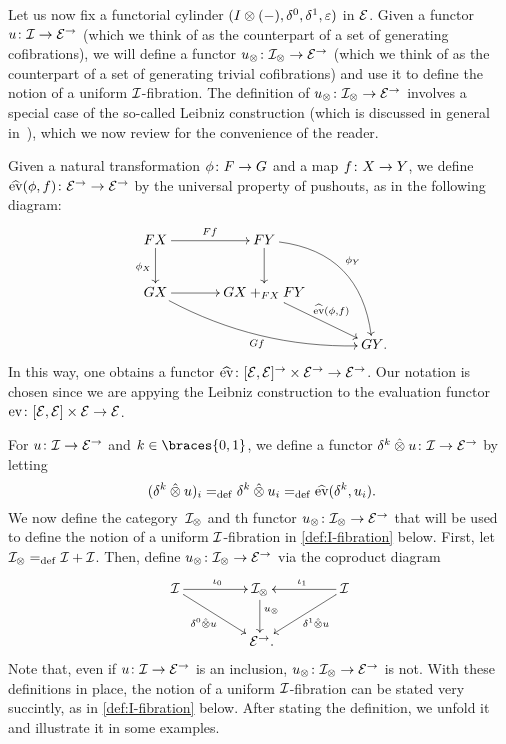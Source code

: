 \documentclass[reqno,10pt,a4paper,oneside,draft]{amsart}
\begin{document}
Let us now fix a functorial cylinder $(\interval \otimes (-), \lcyl, \rcyl, \ccyl)$ in $\calE$.
Given a functor $u \co \cal{I} \to \catE^\to$ (which we think of as the counterpart of a set of generating cofibrations), we will define a functor $u_\otimes \co \cal{I}_\otimes \to \catE^\to$ (which we think of as the counterpart of a set of generating trivial cofibrations) and use it to define the notion of a uniform $\cal{I}$-fibration.
The definition of $u_\otimes \co \cal{I}_\otimes \to \catE^\to$ involves a special case of the so-called Leibniz construction (which is discussed in general in~\cite{riehl-verity:reedy}), which we now review for the convenience of the reader.

Given a natural transformation $\phi \co F \to G$ and a map $f \co X \to Y$, we define $\hateval(\phi, f) \co \catE^\to \to \catE^\to$ by the universal property of pushouts, as in the following diagram:
\begin{gather*}
\xymatrix@C=1.2cm{
  FX \ar[r]^{Ff} \ar[d]_{\phi_X} & FY \ar@/^2pc/[ddr]^{\phi_Y} \ar[d] & \\
  GX \ar@/_1pc/[drr]_{Gf} \ar[r] & GX +_{FX} FY  \ar[dr]^-{\hateval(\phi, f)} & \\
  & & GY
\rlap{.}}
\end{gather*}
In this way, one obtains a functor $\hateval \co [\catE, \catE]^\to \times \catE^\to \to \catE^\to$.
Our notation is chosen since we are appying the Leibniz construction to the evaluation functor $\eval \co [\catE,\catE] \times \calE \to \catE$.

For $u \co \cal{I} \to \catE^\to$ and $k \in \braces{0, 1}$, we define a functor $\kcyl \hatotimes u \co \cal{I} \to \catE^\to$ by letting
\[
(\kcyl \hatotimes u)_i \defeq \kcyl \hatotimes u_i  \defeq \hateval(\kcyl, u_i)  \rlap{.}
\]
We now define the category~$\cal{I}_\otimes$ and th functor $u_\otimes \co \cal{I}_\otimes \to \catE^\to$ that will be used to define the notion of a uniform $\cal{I}$-fibration in \cref{def:I-fibration} below.
First, let $\cal{I}_\otimes \defeq \cal{I} + \cal{I}$.
Then, define $u_\otimes \co \cal{I}_\otimes \to \catE^\to$ via the coproduct diagram
\begin{equation}
\label{equ:u-tensor}
\begin{gathered}
\xymatrix@C+2em{
  \cal{I} \ar[r]^{\iota_0} \ar[dr]_-{\lcyl \hatotimes u} & \cal{I}_\otimes \ar[d]^(.4){u_\otimes} & \cal{I} \ar[dl]^-{\rcyl \hatotimes u} \ar[l]_{\iota_1} \\
  & \catE^\to
\rlap{.}}
\end{gathered}
\end{equation}
Note that, even if $u \co \cal{I} \to \catE^\to$ is an inclusion, $u_\otimes \co \cal{I}_\otimes \to \catE^\to$ is not.
With these definitions in place, the notion of a uniform $\cal{I}$-fibration can be stated very succintly, as in
\cref{def:I-fibration} below.
After stating the definition, we unfold it and illustrate it in some examples.
\end{document}
